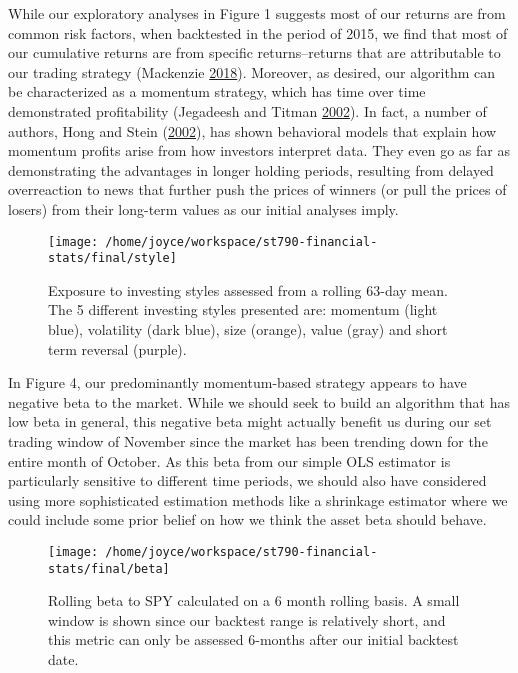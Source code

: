 \documentclass[11pt,]{article}
\begin{document}
While our exploratory analyses in Figure 1 suggests most of our returns
are from common risk factors, when backtested in the period of 2015, we
find that most of our cumulative returns are from specific
returns--returns that are attributable to our trading strategy
(Mackenzie \protect\hyperlink{ref-Quant}{2018}). Moreover, as desired,
our algorithm can be characterized as a momentum strategy, which has
time over time demonstrated profitability (Jegadeesh and Titman
\protect\hyperlink{ref-Jeg}{2002}). In fact, a number of authors, Hong
and Stein (\protect\hyperlink{ref-Hong}{2002}), has shown behavioral
models that explain how momentum profits arise from how investors
interpret data. They even go as far as demonstrating the advantages in
longer holding periods, resulting from delayed overreaction to news that
further push the prices of winners (or pull the prices of losers) from
their long-term values as our initial analyses imply.

\begin{figure}

{\centering \texttt{[image: /home/joyce/workspace/st790-financial-stats/final/style]} 

}

\caption{Exposure to investing styles assessed from a rolling 63-day mean. The 5 different investing styles presented are: momentum (light blue), volatility (dark blue), size (orange), value (gray) and short term reversal (purple).}\label{fig:unnamed-chunk-4}
\end{figure}

In Figure 4, our predominantly momentum-based strategy appears to have
negative beta to the market. While we should seek to build an algorithm
that has low beta in general, this negative beta might actually benefit
us during our set trading window of November since the market has been
trending down for the entire month of October. As this beta from our
simple OLS estimator is particularly sensitive to different time
periods, we should also have considered using more sophisticated
estimation methods like a shrinkage estimator where we could include
some prior belief on how we think the asset beta should behave.

\begin{figure}

{\centering \texttt{[image: /home/joyce/workspace/st790-financial-stats/final/beta]} 

}

\caption{Rolling beta to SPY calculated on a 6 month rolling basis. A small window is shown since our backtest range is relatively short, and this metric can only be assessed 6-months after our initial backtest date.}\label{fig:unnamed-chunk-5}
\end{figure}
\end{document}
